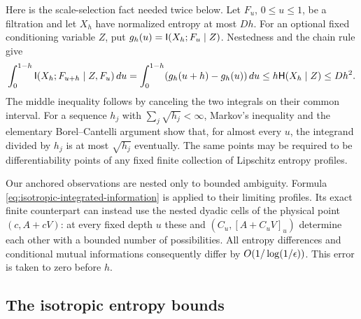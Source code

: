 Here is the scale-selection fact needed twice below. Let $F_u$, $0\leq u\leq1$,
be a filtration and let $X_h$ have normalized entropy at most $Dh$. For an
optional fixed conditioning variable $Z$, put
$g_h(u)=\mathsf I(X_h;F_u\mid Z)$. Nestedness and the chain rule give
\begin{equation}
 \int_0^{1-h}\mathsf I(X_h;F_{u+h}\mid Z,F_u)\,du
 =\int_0^{1-h}(g_h(u+h)-g_h(u))\,du
 \leq h\mathsf H(X_h\mid Z)\leq Dh^2.
 \label{eq:isotropic-integrated-information}
\end{equation}
The middle inequality follows by canceling the two integrals on their common
interval. For a sequence $h_j$ with $\sum_j\sqrt{h_j}<\infty$, Markov's
inequality and the elementary Borel--Cantelli argument show that, for almost
every $u$, the integrand divided by $h_j$ is at most $\sqrt{h_j}$ eventually.
The same points may be required to be differentiability points of any fixed
finite collection of Lipschitz entropy profiles.

Our anchored observations are nested only to bounded ambiguity. Formula
\eqref{eq:isotropic-integrated-information} is applied to their limiting
profiles. Its exact finite counterpart can instead use the nested dyadic
cells of the physical point $(c,A+cV)$: at every fixed depth $u$ these and
$(C_u,[A+C_uV]_u)$ determine each other with a bounded number of possibilities.
All entropy differences and conditional mutual informations consequently
differ by $O(1/\log(1/\epsilon))$. This error is taken to zero before $h$.

\subsection{The isotropic entropy bounds}

